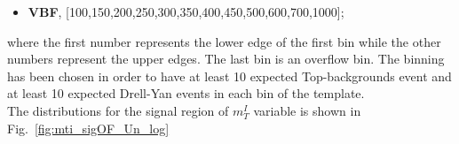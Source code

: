 \begin{itemize}
\item {\bf VBF}, [100,150,200,250,300,350,400,450,500,600,700,1000];
\end{itemize}
where the first number represents the lower edge of the first bin while the other numbers represent the upper edges. The last bin is an overflow bin. 
The binning has been chosen in order to have at least 10 expected Top-backgrounds event and at least 10  expected  Drell-Yan events in each bin of the template.\\
The distributions for the signal region of $m_T^I$ variable is shown in  Fig.~\ref{fig:mti_sigOF_Un_log} 

\begin{figure}[htbp]
\centering
{}
\\
\end{figure}
